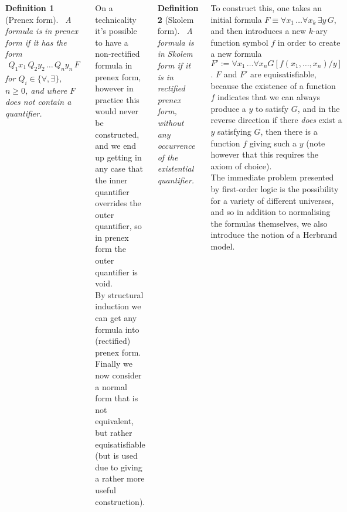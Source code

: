 \documentclass{tikzposter} %
\newtheorem{definition}{Definition}
\begin{document}
\begin{columns}
{{      \begin{definition}[Prenex form]
        \ A formula is in prenex form if it has the form
        \begin{align*}
          Q_{1} x_{1} \, Q_{2} y_{2} \, \dots \, Q_{n} y_{n} \, F
        \end{align*}
        for $Q_{i} \in \{\forall, \exists\}$, $n \ge 0$, and where $F$ does not contain a quantifier.
      \end{definition}
      \hphantom{}

      On a technicality it's possible to have a non-rectified formula in prenex form, however in practice this would never be constructed, and we end up getting in any case that the inner quantifier overrides the outer quantifier, so in prenex form the outer quantifier is void. \\

      By structural induction we can get any formula into (rectified) prenex form. Finally we now consider a normal form that is not equivalent, but rather equisatisfiable (but is used due to giving a rather more useful construction).\\

      \begin{definition}[Skolem form]
      \ A formula is in Skolem form if it is in rectified prenex form, without any occurrence of the existential quantifier.
      \end{definition}
      \hphantom{}

      To construct this, one takes an initial formula $F \equiv \forall x_{1} \, \dots \forall x_{k} \, \exists y \, G$, and then introduces a new $k$-ary function symbol $f$ in order to create a new formula $F' := \forall x_{1} \, \dots \forall x_{n} G[f(x_{1},\dots,x_{n})/y]$. $F$ and $F'$ are equisatisfiable, because the existence of a function $f$ indicates that we can always produce a $y$ to satisfy $G$, and in the reverse direction if there \emph{does} exist a $y$ satisfying $G$, then there is a function $f$ giving such a $y$ (note however that this requires the axiom of choice). \\

      The immediate problem presented by first-order logic is the possibility for a variety of different universes, and so in addition to normalising the formulas themselves, we also introduce the notion of a Herbrand model. \\

}}
\end{columns}
\end{document}
